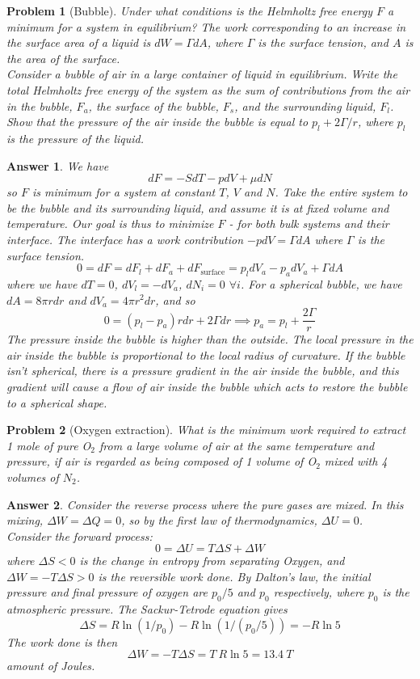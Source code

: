 \documentclass[a4paper]{article}
\theoremstyle{new2}
\newtheorem{ans}{Answer}[section]
\theoremstyle{new}
\newtheorem{qns}{Problem}[section]
\begin{document}
\newpage
\begin{qns}[Bubble]
Under what conditions is the Helmholtz free energy $F$ a minimum for a system in equilibrium? The work corresponding to an increase in the surface area of a liquid is $dW = \Gamma dA$, where $\Gamma$ is the surface tension, and $A$ is the area of the surface.\\[5pt]
Consider a bubble of air in a large container of liquid in equilibrium. Write the total Helmholtz free energy of the system as the sum of contributions from the air in the bubble, $F_a$, the surface of the bubble, $F_s$, and the surrounding liquid, $F_l$. Show that the pressure of the air inside the bubble is equal to $p_l + 2\Gamma/r$, where $p_l$ is the pressure of the liquid.
\end{qns}
\begin{ans}
We have
$$dF=-SdT-pdV+\mu dN$$
so $F$ is minimum for a system at constant $T$, $V$ and $N$. Take the entire system to be the bubble and its surrounding liquid, and assume it is at fixed volume and temperature. Our goal is thus to minimize $F$ - for both bulk systems and their interface. The interface has a work contribution $-pdV=\Gamma dA$ where $\Gamma$ is the surface tension.
$$0=dF=dF_l+dF_a+dF_{\text{surface}}=p_ldV_a-p_adV_a+\Gamma dA$$
where we have $dT=0$, $dV_l=-dV_a$, $dN_i=0$ $\forall i$. For a spherical bubble, we have $dA=8\pi rdr$ and $dV_a=4\pi r^2dr$, and so
$$0=(p_l-p_a)rdr+2\Gamma dr\implies p_a=p_l+\frac{2\Gamma}{r}$$
The pressure inside the bubble is higher than the outside. The local pressure in the air inside the bubble is proportional to the local radius of curvature. If the bubble isn't spherical, there is a pressure gradient in the air inside the bubble, and this gradient will cause a flow of air inside the bubble which acts to restore the bubble to a spherical shape.
\end{ans}
\begin{qns}[Oxygen extraction]
What is the minimum work required to extract 1 mole of pure O$_2$ from a large volume of air at the same temperature and pressure, if air is regarded as being composed of 1 volume of O$_2$ mixed with 4 volumes of $N_2$. 
\end{qns}
\begin{ans}
Consider the reverse process where the pure gases are mixed. In this mixing, $\Delta W=\Delta Q=0$, so by the first law of thermodynamics, $\Delta U=0$.\\[5pt]
Consider the forward process:
$$0=\Delta U=T\Delta S+\Delta W$$
where $\Delta S<0$ is the change in entropy from separating Oxygen, and $\Delta W=-T\Delta S>0$ is the reversible work done. By Dalton's law, the initial pressure and final pressure of oxygen are $p_0/5$ and $p_0$ respectively, where $p_0$ is the atmospheric pressure. The Sackur-Tetrode equation gives
$$\Delta S=R\ln(1/p_0)-R\ln(1/(p_0/5))=-R\ln 5$$
The work done is then
$$\Delta W=-T\Delta S=T~R\ln 5=13.4~T$$
amount of Joules.
\end{ans}
\end{document}
